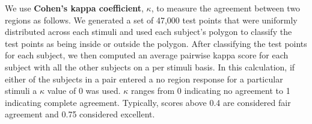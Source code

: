 \documentclass[11pt,letterpaper]{article}
\begin{document}
We use \textbf{Cohen's kappa coefficient}, $\kappa$, to measure the agreement between two regions as follows.  We generated a set of 47,000 test points that were uniformly distributed across each stimuli and used each subject's polygon to classify the test points as being inside or outside the polygon. After classifying the test points for each subject, we then computed an average pairwise kappa score for each subject with all the other subjects on a per stimuli basis. In this calculation, if either of the subjects in a pair entered a no region response for a particular stimuli a $\kappa$ value of 0 was used.  $\kappa$ ranges from 0 indicating no agreement to 1 indicating complete agreement.  Typically, scores above 0.4 are considered fair agreement and 0.75 considered excellent.


\renewcommand{\thefootnote}{\fnsymbol{footnote}}
\end{document}
